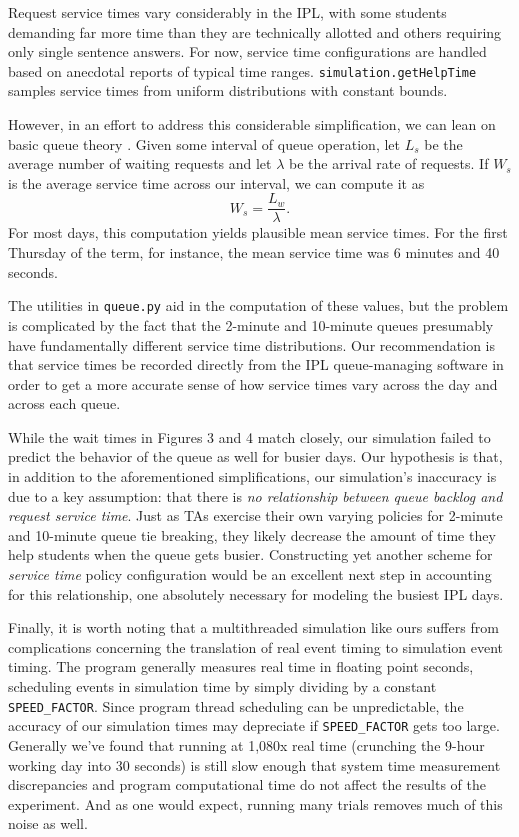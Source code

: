 \documentclass{article}
\begin{document}
\begin{multicols}{2}
Request service times vary considerably in the IPL, with some students demanding far more time than they are technically allotted and others requiring only single sentence answers. For now, service time configurations are handled based on anecdotal reports of typical time ranges. \texttt{simulation.getHelpTime} samples service times from uniform distributions with constant bounds.

However, in an effort to address this considerable simplification, we can lean on basic queue theory \cite{winston}. Given some interval of queue operation, let $L_s$ be the average number of waiting requests and let $\lambda$ be the arrival rate of requests. If $W_s$ is the average service time across our interval, we can compute it as
\begin{equation}
W_s = \frac{L_w}{\lambda}.
\end{equation}
For most days, this computation yields plausible mean service times. For the first Thursday of the term, for instance, the mean service time was 6 minutes and 40 seconds.

The utilities in \texttt{queue.py} aid in the computation of these values, but the problem is complicated by the fact that the 2-minute and 10-minute queues presumably have fundamentally different service time distributions. Our recommendation is that service times be recorded directly from the IPL queue-managing software in order to get a more accurate sense of how service times vary across the day and across each queue.

While the wait times in Figures 3 and 4 match closely, our simulation failed to predict the behavior of the queue as well for busier days. Our hypothesis is that, in addition to the aforementioned simplifications, our simulation's inaccuracy is due to a key assumption: that there is \textit{no relationship between queue backlog and request service time}. Just as TAs exercise their own varying policies for 2-minute and 10-minute queue tie breaking, they likely decrease the amount of time they help students when the queue gets busier. Constructing yet another scheme for 
\textit{service time} policy configuration would be an excellent next step in accounting for this relationship, one absolutely necessary for modeling the busiest IPL days.

Finally, it is worth noting that a multithreaded simulation like ours suffers from complications concerning the translation of real event timing to simulation event timing. The program generally measures real time in floating point seconds, scheduling events in simulation time by simply dividing by a constant \texttt{SPEED\_FACTOR}. Since program thread scheduling can be unpredictable, the accuracy of our simulation times may depreciate if \texttt{SPEED\_FACTOR} gets too large. Generally we've found that running at 1,080x real time (crunching the 9-hour working day into 30 seconds) is still slow enough that system time measurement discrepancies and program computational time do not affect the results of the experiment. And as one would expect, running many trials removes much of this noise as well.


\end{multicols}
\end{document}
